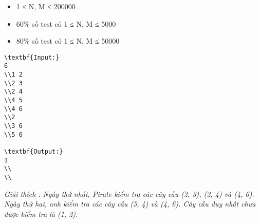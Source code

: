 \begin{itemize}
	\item     1 ≤ N, M ≤ 200000   
	\item     60\% số test có 1 ≤ N, M ≤ 5000   
	\item     80\% số test có 1 ≤ N, M ≤ 50000   
\end{itemize}
\begin{verbatim}
\textbf{Input:}
6
\\1 2
\\2 3
\\2 4
\\4 5
\\4 6
\\2
\\3 6
\\5 6

\textbf{Output:}
1
\\
\\\end{verbatim}

\emph{     Giải thích        : Ngày thứ nhất, Pirate kiểm tra các cây cầu (2, 3), (2, 4) và (4, 6). Ngày thứ hai, anh kiểm tra các cây cầu (5, 4) và (4, 6). Cây cầu duy nhất chưa được kiểm tra là (1, 2).   }
